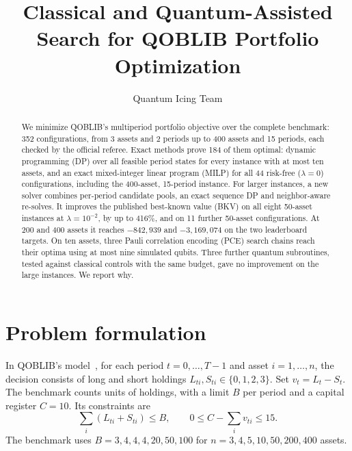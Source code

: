 \documentclass[a4paper]{article}
\title{Classical and Quantum-Assisted Search for QOBLIB Portfolio Optimization}
\author{Quantum Icing Team}
\date{}
\begin{document}
\maketitle

\begin{abstract}
We minimize QOBLIB's multiperiod portfolio objective over the complete benchmark: 352 configurations,
from 3 assets and 2 periods up to 400 assets and 15 periods, each checked by the official referee.
Exact methods prove 184 of them optimal: dynamic programming (DP) over all feasible period states
for every instance with at most ten assets, and an exact mixed-integer linear program (MILP) for all 44
risk-free (\(\lambda=0\)) configurations, including the 400-asset, 15-period instance.
For larger instances, a new solver combines per-period candidate pools, an exact sequence DP and
neighbor-aware re-solves. It improves the published best-known value (BKV) on all eight 50-asset instances at
\(\lambda=10^{-2}\), by up to 416\%, and on 11 further 50-asset configurations.
At 200 and 400 assets it reaches \(-842{,}939\) and \(-3{,}169{,}074\) on the two leaderboard targets.
On ten assets, three Pauli correlation encoding (PCE) search chains reach their optima using at most nine simulated qubits.
Three further quantum subroutines, tested against classical controls with the same budget, gave no improvement on the large instances. We report why.
\end{abstract}

\section{Problem formulation}

In QOBLIB's model~\cite{qoblib}, for each period \(t=0,\ldots,T-1\) and asset \(i=1,\ldots,n\), the decision consists of long and short holdings
\(L_{ti},S_{ti}\in\{0,1,2,3\}\). Set \(v_t=L_t-S_t\). The benchmark counts units of holdings, with a limit \(B\)
per period and a capital register \(C=10\). Its constraints are
\begin{equation}
\label{eq:constraints}
\sum_i(L_{ti}+S_{ti})\le B,\qquad
0\le C-\sum_i v_{ti}\le15 .
\end{equation}
The benchmark uses \(B=3,4,4,4,20,50,100\) for \(n=3,4,5,10,50,200,400\) assets.
\end{document}
